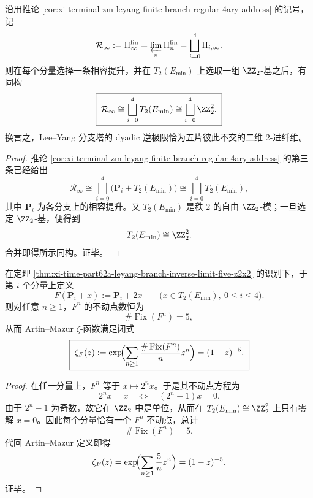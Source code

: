 \begin{theorem}\label{thm:xi-time-part62a-leyang-branch-inverse-limit-five-z2x2}
沿用推论 \ref{cor:xi-terminal-zm-leyang-finite-branch-regular-4ary-address} 的记号，记
\[
\mathcal R_\infty:=\Pi_\infty^{\mathrm{fin}}
=
\varprojlim_n \Pi_n^{\mathrm{fin}}
=
\bigsqcup_{i=0}^{4}\Pi_{i,\infty}.
\]
则在每个分量选择一条相容提升，并在 \(T_2(E_{\min})\) 上选取一组 \(\ZZ_2\)-基之后，有同构
\[
\boxed{\;
\mathcal R_\infty
\cong
\bigsqcup_{i=0}^{4}T_2(E_{\min})
\cong
\bigsqcup_{i=0}^{4}\ZZ_2^2.
\;}
\]
换言之，Lee--Yang 分支塔的 dyadic 逆极限恰为五片彼此不交的二维 \(2\)-进纤维。
\end{theorem}
\begin{proof}
推论 \ref{cor:xi-terminal-zm-leyang-finite-branch-regular-4ary-address} 的第三条已经给出
\[
\mathcal R_\infty
\cong
\bigsqcup_{i=0}^{4}\bigl(\mathbf P_i+T_2(E_{\min})\bigr)
\cong
\bigsqcup_{i=0}^{4}T_2(E_{\min}),
\]
其中 \(\mathbf P_i\) 为各分支上的相容提升。又 \(T_2(E_{\min})\) 是秩 \(2\) 的自由 \(\ZZ_2\)-模；一旦选定 \(\ZZ_2\)-基，便得到
\[
T_2(E_{\min})\cong \ZZ_2^2.
\]
合并即得所示同构。证毕。
\end{proof}

\begin{corollary}\label{cor:xi-time-part62a-leyang-branch-artin-mazur-zeta}
在定理 \ref{thm:xi-time-part62a-leyang-branch-inverse-limit-five-z2x2} 的识别下，于第 \(i\) 个分量上定义
\[
F(\mathbf P_i+x):=\mathbf P_i+2x
\qquad
\bigl(x\in T_2(E_{\min}),\ 0\le i\le 4\bigr).
\]
则对任意 \(n\ge 1\)，\(F^n\) 的不动点数恒为
\[
\#\operatorname{Fix}(F^n)=5,
\]
从而 Artin--Mazur \(\zeta\)-函数满足闭式
\[
\boxed{\;
\zeta_F(z):=
\exp\!\Bigl(
\sum_{n\ge 1}\frac{\#\operatorname{Fix}(F^n)}{n}z^n
\Bigr)
=(1-z)^{-5}.
\;}
\]
\end{corollary}
\begin{proof}
在任一分量上，\(F^n\) 等于 \(x\mapsto 2^n x\)。于是其不动点方程为
\[
2^n x=x
\quad\Longleftrightarrow\quad
(2^n-1)x=0.
\]
由于 \(2^n-1\) 为奇数，故它在 \(\ZZ_2\) 中是单位，从而在
\(
T_2(E_{\min})\cong \ZZ_2^2
\)
上只有零解 \(x=0\)。因此每个分量恰有一个 \(F^n\)-不动点，总计
\[
\#\operatorname{Fix}(F^n)=5.
\]
代回 Artin--Mazur 定义即得
\[
\zeta_F(z)
=
\exp\!\Bigl(\sum_{n\ge 1}\frac{5}{n}z^n\Bigr)
=(1-z)^{-5}.
\]
证毕。
\end{proof}

